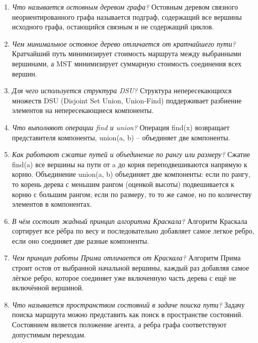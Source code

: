 \begin{enumerate}
	\item \textit{Что называется остовным деревом графа?}\newline
	Остовным деревом связного неориентированного графа называется подграф, содержащий все вершины исходного графа, остающийся связным и не содержащий циклов.
	\item \textit{Чем минимальное остовное дерево отличается от кратчайшего пути?}\newline
	Кратчайший путь минимизирует стоимость маршрута между выбранными вершинами, а MST минимизирует суммарную стоимость соединения всех вершин.
	\item \textit{Для чего используется структура DSU?}\newline
	Структура непересекающихся множеств DSU (Disjoint Set Union, Union-Find) поддерживает разбиение элементов на непересекающиеся компоненты. 
	\item \textit{Что выполняют операции find и union?}\newline
	Операция find(x) возвращает представителя компоненты, union(a, b) -- объединяет две компоненты.
	\item \textit{Как работают сжатие путей и объединение по рангу или размеру?}\newline
	Сжатие find(a) все вершины на пути от a до корня переподвешиваются напрямую к корню. 
	Объединение union(a, b) объединяет две компоненты: если по рангу, то корень дерева с меньшим рангом (оценкой высоты) подвешивается к корню с большим рангом; если по размеру, то то же самое, но по количеству элементов в компонентах.
	\item \textit{В чём состоит жадный принцип алгоритма Краскала?}\newline
	Алгоритм Краскала сортирует все рёбра по весу и последовательно добавляет самое легкое ребро, если оно соединяет две разные компоненты.
	\item \textit{Чем принцип работы Прима отличается от Краскала?}\newline
	Алгоритм Прима строит остов от выбранной начальной вершины, каждый раз добавляя самое лёгкое ребро, которое соединяет уже включенную часть дерева с ещё не включённой вершиной.
	\item \textit{Что называется пространством состояний в задаче поиска пути?}\newline
	Задачу поиска маршрута можно представить как поиск в пространстве состояний. 
	Состоянием является положение агента, а ребра графа соответствуют допустимым переходам. 

\end{enumerate}
